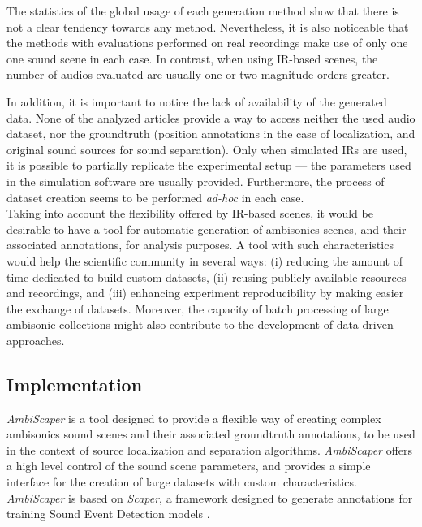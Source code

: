 The statistics of the global usage of each generation method show that there is not a clear tendency towards any method.
Nevertheless, it is also noticeable that the methods with evaluations performed on real recordings make use of only one one sound scene in each case. In contrast, when using IR-based scenes, the number of audios evaluated are usually one or two magnitude orders greater. 

In addition, it is important to notice the lack of availability of the generated data. None of the analyzed articles provide a way to access neither the used audio dataset, nor the groundtruth (position annotations in the case of localization, and original sound sources for sound separation). 
Only when simulated IRs are used, it is possible to partially replicate the experimental setup --- the parameters used in the simulation software are usually provided. 
Furthermore, the process of dataset creation seems to be performed \textit{ad-hoc} in each case. \\

Taking into account the flexibility offered by IR-based scenes, it would be desirable to have a tool for automatic generation of ambisonics scenes, and their associated annotations, for analysis purposes.
A tool with such characteristics would help the scientific community in several ways: (i) reducing the amount of time dedicated to build custom datasets, (ii) reusing publicly available resources and recordings, and (iii) enhancing experiment reproducibility by making easier the exchange of datasets. 
Moreover, the capacity of batch processing of large ambisonic collections might also contribute to the development of data-driven approaches.


\subsection{Implementation}
\label{sec:ambiscaper}

\textit{AmbiScaper} \cite{perez2018ambiscaper} is a tool designed to provide a flexible way of creating complex ambisonics sound scenes and their associated groundtruth annotations, to be used in the context of source localization and separation algorithms.
\textit{AmbiScaper} offers a high level control of the sound scene parameters, and provides a simple interface for the creation of large datasets with custom characteristics.
\textit{AmbiScaper} is based on \textit{Scaper}, a framework designed to generate annotations for training Sound Event Detection models \cite{Salamon2017}.\\

